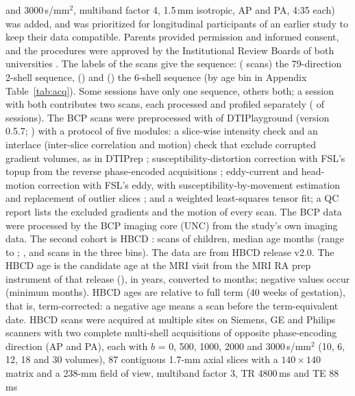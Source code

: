 \documentclass[11pt]{article}
\begin{document}
and 3000\,s/mm$^2$, multiband factor 4, 1.5\,mm isotropic, AP and PA, 4:35 each) was added, and was prioritized for
longitudinal participants of an earlier study to keep their data compatible. Parents provided permission and informed
consent, and the procedures were approved by the Institutional Review Boards of both universities
\citep{howell2019bcp}. The labels of the scans give the sequence: \texttt{\bcpAcqAName} (\bcpAcqAN{} scans) the 79-direction 2-shell sequence,
\texttt{\bcpAcqBName} (\bcpAcqBN{}) and \texttt{\bcpAcqCName} (\bcpAcqCN{}) the 6-shell sequence (by age bin in Appendix
Table~\ref{tab:acq}). Some sessions have only one sequence, others both; a session with both contributes two scans, each
processed and profiled separately (\bcpSessionsBoth{} of \bcpSessions{} sessions). The BCP scans were preprocessed with
 of DTIPlayground (version 0.5.7; \citealp{dtiplayground}) with a protocol of five modules: a slice-wise
intensity check and an interlace (inter-slice correlation and motion) check that exclude corrupted gradient volumes, as
in DTIPrep \citep{oguz2014dtiprep}; susceptibility-distortion correction with FSL's topup from the reverse
phase-encoded acquisitions \citep{andersson2003topup}; eddy-current and head-motion correction with FSL's eddy, with
susceptibility-by-movement estimation and replacement of outlier slices \citep{andersson2016eddy}; and a weighted
least-squares tensor fit; a QC report lists the excluded gradients and the motion of every scan. The BCP data were processed by the BCP imaging
core (UNC) from the study's own imaging data. The
second cohort is HBCD \citep{volkow2021hbcd,dean2024hbcdmri}: \hbcdscans{} scans of \hbcdsubjects{} children, median
age \hbcdagemedian{} months (range \hbcdagemin{} to \hbcdagemax{}; \hbcdbinA{}, \hbcdbinB{} and \hbcdbinC{} scans in
the three bins). The data are from HBCD release v2.0. The HBCD age is the candidate age at the MRI visit from the
MRI RA prep instrument of that release (), in years, converted to months; negative values
occur (minimum \hbcdagemin{} months). HBCD ages are relative to full term (40 weeks of gestation), that is,
term-corrected: a negative age means a scan before the term-equivalent date. HBCD scans were acquired at multiple sites on Siemens, GE and Philips scanners with two complete
multi-shell acquisitions of opposite phase-encoding direction (AP and PA), each with $b$ = 0, 500, 1000, 2000 and
3000\,s/mm$^2$ (10, 6, 12, 18 and 30 volumes), 87 contiguous 1.7-mm axial slices with a $140\times140$ matrix and a 238-mm field of view, multiband factor 3, TR 4800\,ms and TE 88\,ms
\end{document}
